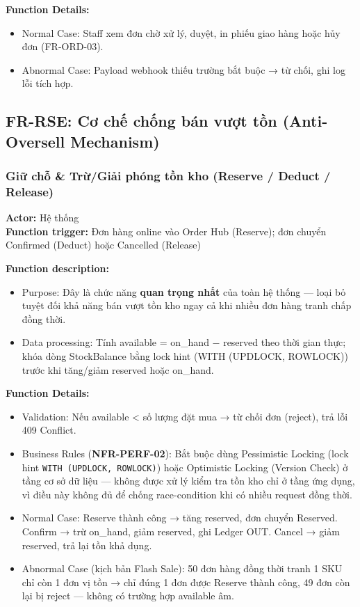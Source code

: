 \textbf{Function Details:}
\begin{itemize}
    \item Normal Case: Staff xem đơn chờ xử lý, duyệt, in phiếu giao hàng hoặc hủy đơn (FR-ORD-03).
    \item Abnormal Case: Payload webhook thiếu trường bắt buộc → từ chối, ghi log lỗi tích hợp.
\end{itemize}

\subsection{FR-RSE: Cơ chế chống bán vượt tồn (Anti-Oversell Mechanism)}

\subsubsection{Giữ chỗ \& Trừ/Giải phóng tồn kho (Reserve / Deduct / Release)}
\textbf{Actor:} Hệ thống \\
\textbf{Function trigger:} Đơn hàng online vào Order Hub (Reserve); đơn chuyển Confirmed (Deduct) hoặc Cancelled (Release)

\textbf{Function description:}
\begin{itemize}
    \item Purpose: Đây là chức năng \textbf{quan trọng nhất} của toàn hệ thống — loại bỏ tuyệt đối khả năng bán vượt tồn kho ngay cả khi nhiều đơn hàng tranh chấp đồng thời.
    \item Data processing: Tính available = on\_hand − reserved theo thời gian thực; khóa dòng StockBalance bằng lock hint (WITH (UPDLOCK, ROWLOCK)) trước khi tăng/giảm reserved hoặc on\_hand.
\end{itemize}

\textbf{Function Details:}
\begin{itemize}
    \item Validation: Nếu available < số lượng đặt mua → từ chối đơn (reject), trả lỗi 409 Conflict.
    \item Business Rules (\textbf{NFR-PERF-02}): Bắt buộc dùng Pessimistic Locking (lock hint \texttt{WITH (UPDLOCK, ROWLOCK)}) hoặc Optimistic Locking (Version Check) ở tầng cơ sở dữ liệu — không được xử lý kiểm tra tồn kho chỉ ở tầng ứng dụng, vì điều này không đủ để chống race-condition khi có nhiều request đồng thời.
    \item Normal Case: Reserve thành công → tăng reserved, đơn chuyển Reserved. Confirm → trừ on\_hand, giảm reserved, ghi Ledger OUT. Cancel → giảm reserved, trả lại tồn khả dụng.
    \item Abnormal Case (kịch bản Flash Sale): 50 đơn hàng đồng thời tranh 1 SKU chỉ còn 1 đơn vị tồn → chỉ đúng 1 đơn được Reserve thành công, 49 đơn còn lại bị reject — không có trường hợp available âm.
\end{itemize}

